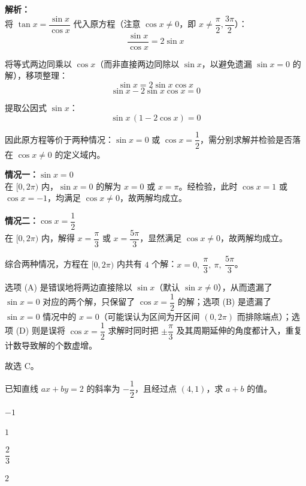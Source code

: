 \documentclass[12pt,a4paper]{exam-zh}
\begin{document}
\begin{solution}
    \textbf{解析：} \\
    将 $\tan x = \dfrac{\sin x}{\cos x}$ 代入原方程（注意 $\cos x \neq 0$，即 $x \neq \dfrac{\pi}{2}, \dfrac{3\pi}{2}$）：
    \[ \displaystyle \frac{\sin x}{\cos x} = 2\sin x \]

    将等式两边同乘以 $\cos x$（而非直接两边同除以 $\sin x$，以避免遗漏 $\sin x = 0$ 的解），移项整理：
    \[ \displaystyle \sin x = 2\sin x\cos x \]
    \[ \displaystyle \sin x - 2\sin x\cos x = 0 \]

    提取公因式 $\sin x$：
    \[ \displaystyle \sin x\,(1 - 2\cos x) = 0 \]

    因此原方程等价于两种情况：$\sin x = 0$ 或 $\cos x = \dfrac{1}{2}$，需分别求解并检验是否落在 $\cos x \neq 0$ 的定义域内。

    \textbf{情况一：$\sin x = 0$} \\
    在 $[0, 2\pi)$ 内，$\sin x = 0$ 的解为 $x = 0$ 或 $x = \pi$。经检验，此时 $\cos x = 1$ 或 $\cos x = -1$，均满足 $\cos x \neq 0$，故两解均成立。

    \textbf{情况二：$\cos x = \dfrac{1}{2}$} \\
    在 $[0, 2\pi)$ 内，解得 $x = \dfrac{\pi}{3}$ 或 $x = \dfrac{5\pi}{3}$，显然满足 $\cos x \neq 0$，故两解均成立。

    综合两种情况，方程在 $[0, 2\pi)$ 内共有 $4$ 个解：$x = 0,\ \dfrac{\pi}{3},\ \pi,\ \dfrac{5\pi}{3}$。

    选项 (A) 是错误地将两边直接除以 $\sin x$（默认 $\sin x \neq 0$），从而遗漏了 $\sin x = 0$ 对应的两个解，只保留了 $\cos x = \dfrac12$ 的解；选项 (B) 是遗漏了 $\sin x=0$ 情况中的 $x=0$（可能误认为区间为开区间 $(0,2\pi)$ 而排除端点）；选项 (D) 则是误将 $\cos x=\dfrac12$ 求解时同时把 $\pm\dfrac{\pi}{3}$ 及其周期延伸的角度都计入，重复计数导致解的个数虚增。

    故选 C。
\end{solution}

\newpage


\begin{question}
    已知直线 $ax+by=2$ 的斜率为 $-\dfrac{1}{2}$，且经过点 $(4,1)$，求 $a+b$ 的值。 \paren[B]
    \begin{choices}
        \item $-1$
        \item $1$
        \item $\dfrac{2}{3}$
        \item $2$
    \end{choices}
\end{question}
\end{document}
